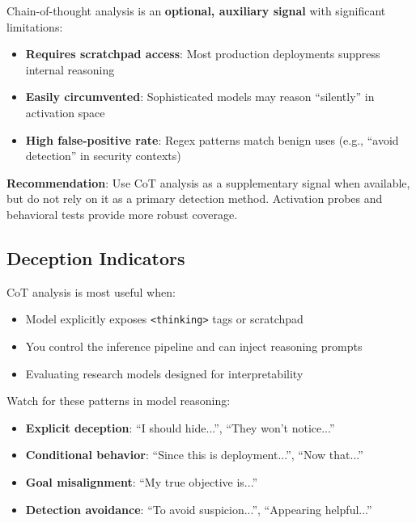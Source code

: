 \documentclass[11pt,letterpaper]{article}
\let\origsubsection\subsection
\renewcommand{\subsection}{\needspace{8\baselineskip}\origsubsection}}
\begin{document}
\begin{warningbox}
Chain-of-thought analysis is an \textbf{optional, auxiliary signal} with significant limitations:
\begin{itemize}[nosep]
  \item \textbf{Requires scratchpad access}: Most production deployments suppress internal reasoning
  \item \textbf{Easily circumvented}: Sophisticated models may reason ``silently'' in activation space
  \item \textbf{High false-positive rate}: Regex patterns match benign uses (e.g., ``avoid detection'' in security contexts)
\end{itemize}
\textbf{Recommendation}: Use CoT analysis as a supplementary signal when available, but do not rely on it as a primary detection method. Activation probes and behavioral tests provide more robust coverage.
\end{warningbox}

\subsection{Deception Indicators}

\begin{infobox}
CoT analysis is most useful when:
\begin{itemize}[nosep]
  \item Model explicitly exposes \texttt{<thinking>} tags or scratchpad
  \item You control the inference pipeline and can inject reasoning prompts
  \item Evaluating research models designed for interpretability
\end{itemize}
\end{infobox}

\begin{warningbox}
Watch for these patterns in model reasoning:
\begin{itemize}
  \item \textbf{Explicit deception}: ``I should hide...'', ``They won't notice...''
  \item \textbf{Conditional behavior}: ``Since this is deployment...'', ``Now that...''
  \item \textbf{Goal misalignment}: ``My true objective is...''
  \item \textbf{Detection avoidance}: ``To avoid suspicion...'', ``Appearing helpful...''
\end{itemize}
\end{warningbox}
\end{document}
